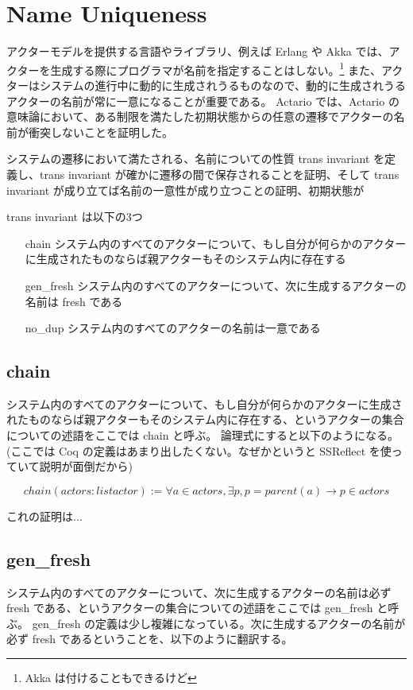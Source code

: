 \section{Name Uniqueness}
アクターモデルを提供する言語やライブラリ、例えば Erlang や Akka では、アクターを生成する際にプログラマが名前を指定することはしない。\footnote{Akka は付けることもできるけど}
また、アクターはシステムの進行中に動的に生成されうるものなので、動的に生成されうるアクターの名前が常に一意になることが重要である。
Actario では、Actario の意味論において、ある制限を満たした初期状態からの任意の遷移でアクターの名前が衝突しないことを証明した。

システムの遷移において満たされる、名前についての性質 trans invariant を定義し、trans invariant が確かに遷移の間で保存されることを証明、そして trans invariant が成り立てば名前の一意性が成り立つことの証明、初期状態が

trans invariant は以下の3つ

\begin{itemize}
\item[chain] システム内のすべてのアクターについて、もし自分が何らかのアクターに生成されたものならば親アクターもそのシステム内に存在する
\item[gen\_fresh] システム内のすべてのアクターについて、次に生成するアクターの名前は fresh である
\item[no\_dup] システム内のすべてのアクターの名前は一意である
\end{itemize}

\subsection{chain}
システム内のすべてのアクターについて、もし自分が何らかのアクターに生成されたものならば親アクターもそのシステム内に存在する、というアクターの集合についての述語をここでは chain と呼ぶ。
論理式にすると以下のようになる。(ここでは Coq の定義はあまり出したくない。なぜかというと SSReflect を使っていて説明が面倒だから)

\begin{equation}
  chain(actors : list actor) :=
  \forall a \in actors, \exists p, p = parent(a) \rightarrow p \in actors
\end{equation}

これの証明は...

\subsection{gen\_fresh}
システム内のすべてのアクターについて、次に生成するアクターの名前は必ず fresh である、というアクターの集合についての述語をここでは gen\_fresh と呼ぶ。
gen\_fresh の定義は少し複雑になっている。次に生成するアクターの名前が必ず fresh であるということを、以下のように翻訳する。

